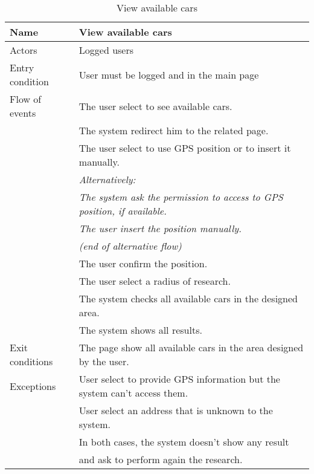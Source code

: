 \documentclass[10pt, a4paper,titlepage]{article}
\begin{document}
\begin{table}[h]
\caption{View available cars} \label{tab:scenario3}
\begin{tabular}{|l|l|}
\hline
Name & View available cars \\
\hline
Actors & Logged users \\
\hline
Entry condition & User must be logged and in the main page \\
\hline
Flow of events & The user select to see available cars.\\
& The system redirect him to the related page. \\
& The user select to use GPS position or to insert it manually.\\
& \textit{Alternatively:} \\
& \textit{The system ask the permission to access to GPS position, if available.}\\
& \textit{The user insert the position manually.} \\
& \textit{(end of alternative flow)}\\
& The user confirm the position.\\
& The user select a radius of research.\\
& The system checks all available cars in the designed area.\\
& The system shows all results.\\
\hline
Exit conditions & The page show all available cars in the area designed by the user. \\
\hline
Exceptions & User select to provide GPS information but the system can't access them.\\
& User select an address that is unknown to the system.\\
& In both cases, the system doesn't show any result\\
& and ask to perform again the research.\\
\hline
\end{tabular}
\end{table}
\end{document}
